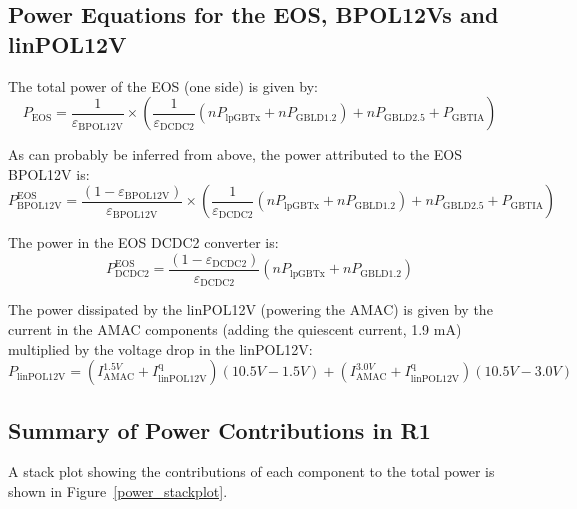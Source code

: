 \subsection{Power Equations for the EOS, BPOL12Vs and linPOL12V}

The total power of the EOS (one side) is given by:
\begin{equation}
P_\text{EOS} = \frac{1}{\varepsilon_\text{BPOL12V}}\times
  \left( \frac{1}{\varepsilon_\text{DCDC2}} (n P_\text{lpGBTx} + n P_\text{GBLD1.2}) + n P_\text{GBLD2.5} + P_\text{GBTIA} \right)
\end{equation}

As can probably be inferred from above, the power attributed to the EOS BPOL12V is:
\begin{equation}
P^\text{EOS}_\text{BPOL12V} = \frac{(1-\varepsilon_\text{BPOL12V})}{\varepsilon_\text{BPOL12V}}\times
  \left( \frac{1}{\varepsilon_\text{DCDC2}} (n P_\text{lpGBTx} + n P_\text{GBLD1.2}) + n P_\text{GBLD2.5} + P_\text{GBTIA} \right)
\end{equation}

The power in the EOS DCDC2 converter is:
\begin{equation}
P^\text{EOS}_\text{DCDC2} = \frac{(1-\varepsilon_\text{DCDC2})}{\varepsilon_\text{DCDC2}} \left(n P_\text{lpGBTx} + n P_\text{GBLD1.2}\right)
\end{equation}


The power dissipated by the linPOL12V (powering the AMAC) is given by the current in the AMAC components
(adding the quiescent current, 1.9 mA) multiplied by the voltage drop in the linPOL12V:
\begin{equation}
P_\text{linPOL12V} = (I^{1.5V}_\text{AMAC} + I^\text{q}_\text{linPOL12V})\left(  10.5V - 1.5V \right)
                   + (I^{3.0V}_\text{AMAC} + I^\text{q}_\text{linPOL12V})\left(  10.5V - 3.0V \right)
\label{eq:amac_regulator}
\end{equation}

\subsection{Summary of Power Contributions in R1}

A stack plot showing the contributions of each component to the total power is shown in
Figure~\ref{power_stackplot}.

